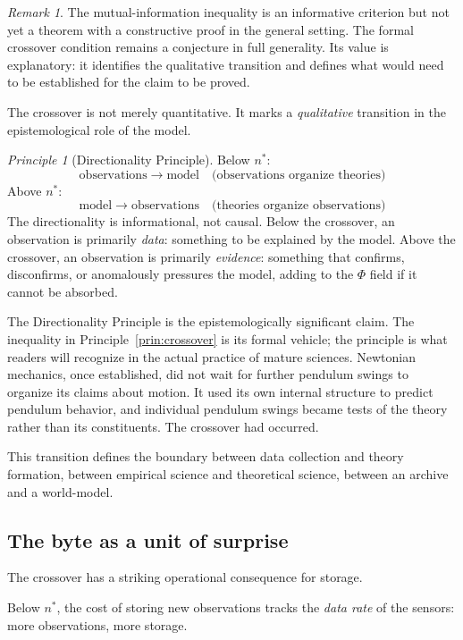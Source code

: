\documentclass[11pt, a4paper]{article}
\theoremstyle{plain}
\theoremstyle{definition}
\theoremstyle{remark}
\newtheorem{remark}[theorem]{Remark}
\newtheorem{principle}[theorem]{Principle}
\newcommand{\PhiF}{\varPhi}
\newcommand{\nstar}{n^{*}}
\begin{document}
\begin{remark}
The mutual-information inequality is an informative criterion but
not yet a theorem with a constructive proof in the general setting.
The formal crossover condition remains a conjecture in full generality.
Its value is explanatory: it identifies the qualitative transition
and defines what would need to be established for the claim to be proved.
\end{remark}

The crossover is not merely quantitative. It marks a \emph{qualitative}
transition in the epistemological role of the model.

\begin{principle}[Directionality Principle]
\label{prin:direction}
Below $\nstar$:
\[
  \text{observations} \;\longrightarrow\; \text{model}
  \quad\text{(observations organize theories)}
\]
Above $\nstar$:
\[
  \text{model} \;\longrightarrow\; \text{observations}
  \quad\text{(theories organize observations)}
\]
The directionality is informational, not causal.
Below the crossover, an observation is primarily \emph{data}:
something to be explained by the model.
Above the crossover, an observation is primarily \emph{evidence}:
something that confirms, disconfirms, or anomalously pressures
the model, adding to the $\PhiF$ field if it cannot be absorbed.
\end{principle}

The Directionality Principle is the epistemologically significant
claim. The inequality in Principle~\ref{prin:crossover} is its
formal vehicle; the principle is what readers will recognize in
the actual practice of mature sciences. Newtonian mechanics, once
established, did not wait for further pendulum swings to organize
its claims about motion. It used its own internal structure to predict
pendulum behavior, and individual pendulum swings became tests of
the theory rather than its constituents. The crossover had occurred.

This transition defines the boundary between data collection and
theory formation, between empirical science and theoretical science,
between an archive and a world-model.

\subsection{The byte as a unit of surprise}

The crossover has a striking operational consequence for storage.

Below $\nstar$, the cost of storing new observations tracks the
\emph{data rate} of the sensors: more observations, more storage.
\end{document}
